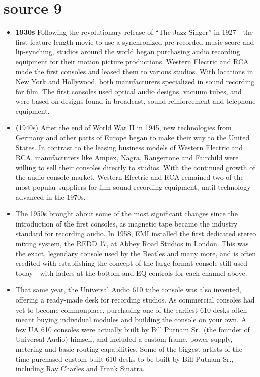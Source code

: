\documentclass[12pt]{article}
\begin{document}
    \section{source 9 \autocite{guitarcenterEvolutionRecordingMixing}}
        \begin{itemize}
            \item \textbf{1930s} Following the revolutionary release of “The Jazz Singer” in 1927—the first feature-length movie to use a synchronized pre-recorded music score and lip-synching, studios around the world began purchasing audio recording equipment for their motion picture productions. Western Electric and RCA made the first consoles and leased them to various studios. With locations in New York and Hollywood, both manufacturers specialized in sound recording for film. The first consoles used optical audio designs, vacuum tubes, and were based on designs found in broadcast, sound reinforcement and telephone equipment.
            \item \textbf(1940s) After the end of World War II in 1945, new technologies from Germany and other parts of Europe began to make their way to the United States. In contrast to the leasing business models of Western Electric and RCA, manufacturers like Ampex, Nagra, Rangertone and Fairchild were willing to sell their consoles directly to studios. With the continued growth of the audio console market, Western Electric and RCA remained two of the most popular suppliers for film sound recording equipment, until technology advanced in the 1970s.
            \item The 1950s brought about some of the most significant changes since the introduction of the first consoles, as magnetic tape became the industry standard for recording audio. In 1958, EMI installed the first dedicated stereo mixing system, the REDD 17, at Abbey Road Studios in London. This was the exact, legendary console used by the Beatles and many more, and is often credited with establishing the concept of the large-format console still used today—with faders at the bottom and EQ controls for each channel above.
            \item That same year, the Universal Audio 610 tube console was also invented, offering a ready-made desk for recording studios. As commercial consoles had yet to become commonplace, purchasing one of the earliest 610 desks often meant buying individual modules and building the console on your own. A few UA 610 consoles were actually built by Bill Putnam Sr.\ (the founder of Universal Audio) himself, and included a custom frame, power supply, metering and basic routing capabilities. Some of the biggest artists of the time purchased custom-built 610 desks to be built by Bill Putnam Sr., including Ray Charles and Frank Sinatra.

\end{itemize}
\end{document}

